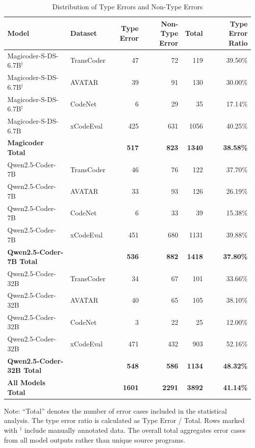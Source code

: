 \begin{table}[t]
\centering
\caption{Distribution of Type Errors and Non-Type Errors}
\label{tab:type_error_distribution}
\small
\setlength{\tabcolsep}{6pt}
\renewcommand{\arraystretch}{1.15}
\begin{tabular}{llrrrr}
\toprule
\textbf{Model} & \textbf{Dataset} & \textbf{Type Error} & \textbf{Non-Type Error} & \textbf{Total} & \textbf{Type Error Ratio} \\
\midrule
Magicoder-S-DS-6.7B$^\dagger$ & TransCoder & 47  & 72  & 119  & 39.50\% \\
Magicoder-S-DS-6.7B$^\dagger$ & AVATAR     & 39  & 91  & 130  & 30.00\% \\
Magicoder-S-DS-6.7B$^\dagger$ & CodeNet    & 6   & 29  & 35   & 17.14\% \\
Magicoder-S-DS-6.7B           & xCodeEval  & 425 & 631 & 1056 & 40.25\% \\
\textbf{Magicoder Total}      &            & \textbf{517} & \textbf{823} & \textbf{1340} & \textbf{38.58\%} \\
\midrule
Qwen2.5-Coder-7B & TransCoder & 46  & 76  & 122  & 37.70\% \\
Qwen2.5-Coder-7B & AVATAR     & 33  & 93  & 126  & 26.19\% \\
Qwen2.5-Coder-7B & CodeNet    & 6   & 33  & 39   & 15.38\% \\
Qwen2.5-Coder-7B & xCodeEval  & 451 & 680 & 1131 & 39.88\% \\
\textbf{Qwen2.5-Coder-7B Total} & & \textbf{536} & \textbf{882} & \textbf{1418} & \textbf{37.80\%} \\
\midrule
Qwen2.5-Coder-32B & TransCoder & 34  & 67  & 101  & 33.66\% \\
Qwen2.5-Coder-32B & AVATAR     & 40  & 65  & 105  & 38.10\% \\
Qwen2.5-Coder-32B & CodeNet    & 3   & 22  & 25   & 12.00\% \\
Qwen2.5-Coder-32B & xCodeEval  & 471 & 432 & 903  & 52.16\% \\
\textbf{Qwen2.5-Coder-32B Total} & & \textbf{548} & \textbf{586} & \textbf{1134} & \textbf{48.32\%} \\
\midrule
\textbf{All Models Total} & & \textbf{1601} & \textbf{2291} & \textbf{3892} & \textbf{41.14\%} \\
\bottomrule
\end{tabular}

\vspace{0.5em}
\begin{minipage}{0.95\linewidth}
\footnotesize
Note: ``Total'' denotes the number of error cases included in the statistical analysis.
The type error ratio is calculated as Type Error / Total.
Rows marked with $^\dagger$ include manually annotated data.
The overall total aggregates error cases from all model outputs rather than unique source programs.
\end{minipage}
\end{table}
